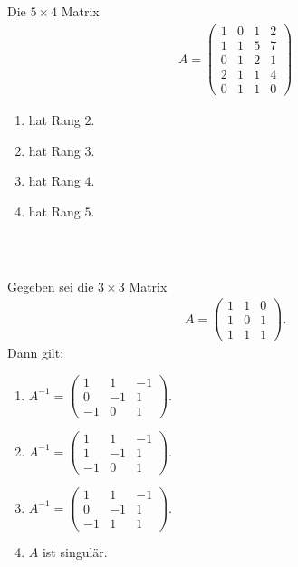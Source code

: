\subsection*{}
Die $5 \times 4$ Matrix
\begin{align*}
A
=
\begin{pmatrix}
1 & 0  & 1 & 2\\
1 & 1 & 5 & 7\\
0 & 1 & 2 & 1 \\
2 & 1 & 1 & 4 \\
0 & 1 & 1 & 0 
\end{pmatrix}
\end{align*}
\renewcommand{\labelenumi}{(\alph{enumi})}
\begin{enumerate}
\item 
hat Rang $2$.
\item
hat Rang $3$.
\item
hat Rang $4$.
\item
hat Rang $5$.
\end{enumerate}
\ \\
\subsection*{}
Gegeben sei die $3 \times 3 $ Matrix
\begin{align*}
A
= 
\begin{pmatrix}
1 & 1 & 0\\
1 & 0 & 1 \\
1 & 1 & 1
\end{pmatrix}.
\end{align*}
Dann gilt:
\renewcommand{\labelenumi}{(\alph{enumi})}
\begin{enumerate}
\item 
$A^{-1}
= 
\begin{pmatrix}
1 & 1 & -1 \\
0 & -1 & 1\\
-1 & 0 & 1
\end{pmatrix}$.
\item
$A^{-1}
= 
\begin{pmatrix}
1 & 1 & -1 \\
1 & -1 & 1\\
-1 & 0 & 1
\end{pmatrix}$.
\item
$A^{-1}
= 
\begin{pmatrix}
1 & 1 & -1 \\
0 & -1 & 1\\
-1 & 1 & 1
\end{pmatrix}$.
\item
$A$ ist singulär.
\end{enumerate}

